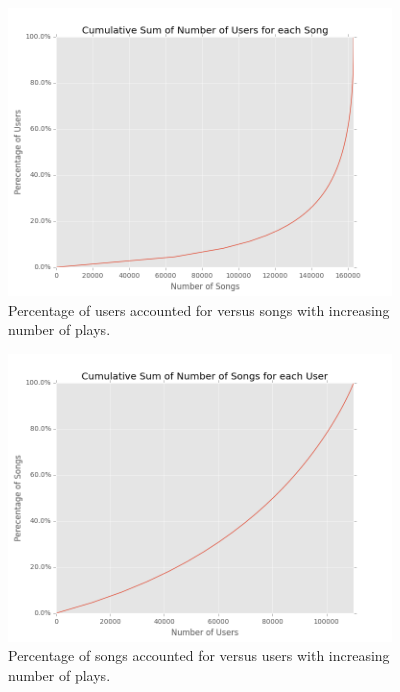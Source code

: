\documentclass[11pt,preprint]{aastex}
\begin{document}
\begin{figure}[htbp] %
   \centering
   \includegraphics[width=4in]{../plots/final/cumsum-songs.png} 
   \caption{Percentage of users accounted for versus songs with increasing number of plays.}
   \label{fig:t}
\end{figure}

\begin{figure}[htbp] %
   \centering
   \includegraphics[width=4in]{../plots/final/cumsum-users.png} 
   \caption{Percentage of songs accounted for versus users with increasing number of plays.}
   \label{fig:t}
\end{figure}


%
%
\end{document}
